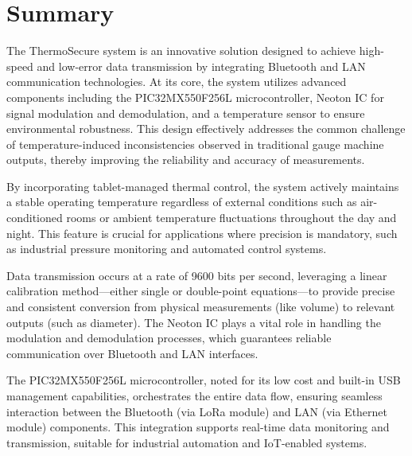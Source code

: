 \documentclass[12pt]{report}
\begin{document}
\section{Summary}
\begin{flushleft}
The ThermoSecure system is an innovative solution designed to achieve high-speed and low-error data transmission by integrating Bluetooth and LAN communication technologies. At its core, the system utilizes advanced components including the PIC32MX550F256L microcontroller, Neoton IC for signal modulation and demodulation, and a temperature sensor to ensure environmental robustness. This design effectively addresses the common challenge of temperature-induced inconsistencies observed in traditional gauge machine outputs, thereby improving the reliability and accuracy of measurements.

By incorporating tablet-managed thermal control, the system actively maintains a stable operating temperature regardless of external conditions such as air-conditioned rooms or ambient temperature fluctuations throughout the day and night. This feature is crucial for applications where precision is mandatory, such as industrial pressure monitoring and automated control systems.

Data transmission occurs at a rate of 9600 bits per second, leveraging a linear calibration method—either single or double-point equations—to provide precise and consistent conversion from physical measurements (like volume) to relevant outputs (such as diameter). The Neoton IC plays a vital role in handling the modulation and demodulation processes, which guarantees reliable communication over Bluetooth and LAN interfaces.

The PIC32MX550F256L microcontroller, noted for its low cost and built-in USB management capabilities, orchestrates the entire data flow, ensuring seamless interaction between the Bluetooth (via LoRa module) and LAN (via Ethernet module) components. This integration supports real-time data monitoring and transmission, suitable for industrial automation and IoT-enabled systems.


\end{flushleft}
\end{document}
